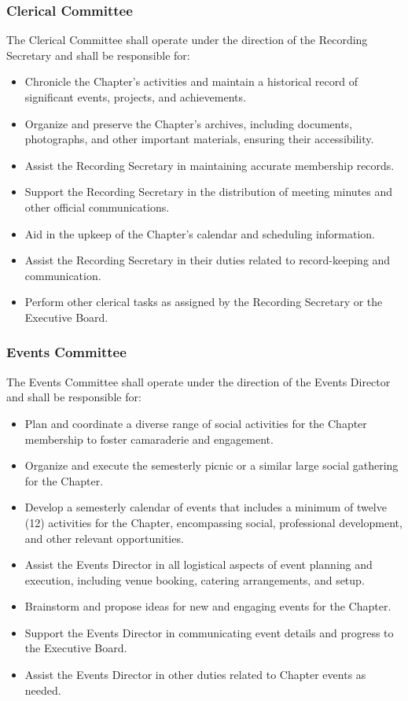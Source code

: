 \documentclass[10pt, oneside]{article}
\begin{document}
\subsubsection{Clerical Committee}
The Clerical Committee shall operate under the direction of the Recording Secretary and shall be responsible for:
\begin{itemize}
    \item Chronicle the Chapter's activities and maintain a historical record of significant events, projects, and achievements.
    \item Organize and preserve the Chapter's archives, including documents, photographs, and other important materials, ensuring their accessibility.
    \item Assist the Recording Secretary in maintaining accurate membership records.
    \item Support the Recording Secretary in the distribution of meeting minutes and other official communications.
    \item Aid in the upkeep of the Chapter's calendar and scheduling information.
    \item Assist the Recording Secretary in their duties related to record-keeping and communication.
    \item Perform other clerical tasks as assigned by the Recording Secretary or the Executive Board.
\end{itemize}

\subsubsection{Events Committee}
The Events Committee shall operate under the direction of the Events Director and shall be responsible for:
\begin{itemize}
    \item Plan and coordinate a diverse range of social activities for the Chapter membership to foster camaraderie and engagement.
    \item Organize and execute the semesterly picnic or a similar large social gathering for the Chapter.
    \item Develop a semesterly calendar of events that includes a minimum of twelve (12) activities for the Chapter, encompassing social, professional development, and other relevant opportunities.
    \item Assist the Events Director in all logistical aspects of event planning and execution, including venue booking, catering arrangements, and setup.
    \item Brainstorm and propose ideas for new and engaging events for the Chapter.
    \item Support the Events Director in communicating event details and progress to the Executive Board.
    \item Assist the Events Director in other duties related to Chapter events as needed.
\end{itemize}
\end{document}
